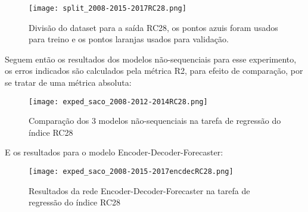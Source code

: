 \begin{figure}[H]
  \centering
\texttt{[image: split\_2008-2015-2017RC28.png]}
\caption{Divisão do dataset para a saída RC28, os pontos azuis foram usados para
treino e os pontos laranjas usados para validação.}
  \label{fig:divrc28}
\end{figure}


Seguem então os resultados dos modelos não-sequenciais para esse experimento, os
erros indicados são calculados pela métrica R2, para efeito de comparação, por
se tratar de uma métrica absoluta: \\




\begin{figure}[H]
\centering
\texttt{[image: exped\_saco\_2008-2012-2014RC28.png]}
\caption{Comparação dos 3 modelos não-sequenciais na tarefa de regressão do índice RC28}
\label{fig:3nseq}
\end{figure}



E os resultados para o modelo Encoder-Decoder-Forecaster: \\


\begin{figure}[H]
\centering
\texttt{[image: exped\_saco\_2008-2015-2017encdecRC28.png]}
\caption{Resultados da rede Encoder-Decoder-Forecaster na tarefa de regressão do índice RC28}
\label{fig:3nseq}
\end{figure}



